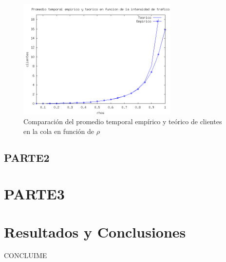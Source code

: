 \documentclass{sig-alternate}
\begin{document}
\begin{figure}[ht]
\begin{center}
\includegraphics[width=8cm]{teoricoVSempirico}
\caption{\label{fig:meanQueueVS} Comparaci\'on del promedio temporal emp\'irico y te\'orico de clientes en la cola en funci\'on de $\rho$}
\end{center}
\end{figure}

\newpage

\subsection{PARTE2}
\label{sec:parte2}

\section{PARTE3}
\label{sec:mm2}

\section{Resultados y Conclusiones}
\label{sec:conclusiones}
CONCLUIME

\end{document}
